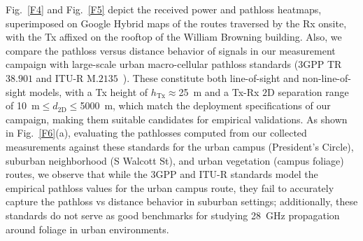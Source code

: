 \documentclass[10pt, twocolumn]{IEEEtran}
\begin{document}
Fig.~\ref{F4} and Fig.~\ref{F5} depict the received power and pathloss heatmaps, superimposed on Google Hybrid maps of the routes traversed by the Rx onsite, with the Tx affixed on the rooftop of the William Browning building. Also, we compare the pathloss versus distance behavior of signals in our measurement campaign with large-scale urban macro-cellular pathloss standards ($3$GPP TR$38.901$ and ITU-R M$.2135$~\cite{MacCartneyModelsOverview}). These constitute both line-of-sight and non-line-of-sight models, with a Tx height of $h_{\text{Tx}}{\approx}$\SI{25}{\meter} and a Tx-Rx $2$D separation range of \SI{10}{\meter}${\leq}d_{2\text{D}}{\leq}$\SI{5000}{\meter}, which match the deployment specifications of our campaign, making them suitable candidates for empirical validations. As shown in Fig.~\ref{F6}(a), evaluating the pathlosses computed from our collected measurements against these standards for the urban campus (President's Circle), suburban neighborhood (S Walcott St), and urban vegetation (campus foliage) routes, we observe that while the $3$GPP and ITU-R standards model the empirical pathloss values for the urban campus route, they fail to accurately capture the pathloss vs distance behavior in suburban settings; additionally, these standards do not serve as good benchmarks for studying \SI{28}{\giga\hertz} propagation around foliage in urban environments.
\end{document}
